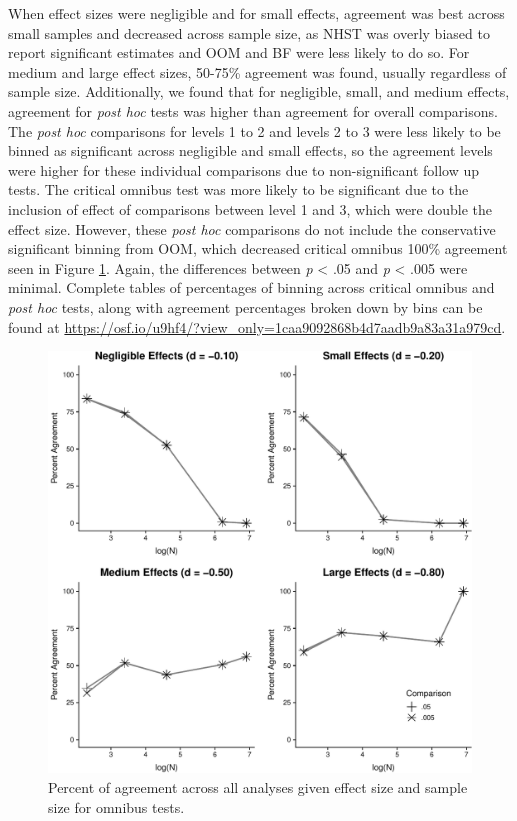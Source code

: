 \documentclass[,man, mask]{apa6}
\theoremstyle{definition}
\theoremstyle{definition}
\theoremstyle{definition}
\theoremstyle{remark}
\begin{document}
When effect sizes were negligible and for small effects, agreement was
best across small samples and decreased across sample size, as NHST was
overly biased to report significant estimates and OOM and BF were less
likely to do so. For medium and large effect sizes, 50-75\% agreement
was found, usually regardless of sample size. Additionally, we found
that for negligible, small, and medium effects, agreement for \emph{post
hoc} tests was higher than agreement for overall comparisons. The
\emph{post hoc} comparisons for levels 1 to 2 and levels 2 to 3 were
less likely to be binned as significant across negligible and small
effects, so the agreement levels were higher for these individual
comparisons due to non-significant follow up tests. The critical omnibus
test was more likely to be significant due to the inclusion of effect of
comparisons between level 1 and 3, which were double the effect size.
However, these \emph{post hoc} comparisons do not include the
conservative significant binning from OOM, which decreased critical
omnibus 100\% agreement seen in Figure \ref{fig:agree-graph-omnibus}.
Again, the differences between \emph{p} \textless{} .05 and \emph{p}
\textless{} .005 were minimal. Complete tables of percentages of binning
across critical omnibus and \emph{post hoc} tests, along with agreement
percentages broken down by bins can be found at
\url{https://osf.io/u9hf4/?view_only=1caa9092868b4d7aadb9a83a31a979cd}.

\begin{figure}
\centering
\includegraphics{alt_nhst_FINAL_files/figure-latex/agree-graph-omnibus-1.pdf}
\caption{\label{fig:agree-graph-omnibus}Percent of agreement across all
analyses given effect size and sample size for omnibus tests.}
\end{figure}
\end{document}
